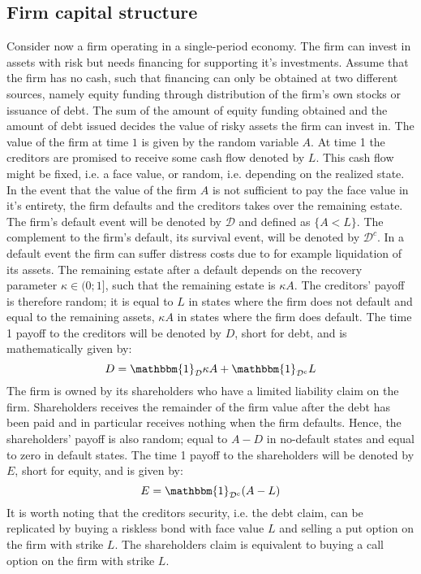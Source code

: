 \documentclass[main.tex]{subfiles}
\begin{document}
    \subsection{Firm capital structure}
        Consider now a firm operating in a single-period economy.
        The firm can invest in assets with risk but needs financing for supporting it's investments.
        Assume that the firm has no cash, such that financing can only be obtained at two different sources, namely equity funding through distribution of the firm's own stocks or issuance of debt.
        The sum of the amount of equity funding obtained and the amount of debt issued decides the value of risky assets the firm can invest in.
        The value of the firm at time $1$ is given by the random variable $A$.
        At time 1 the creditors are promised to receive some cash flow denoted by $L$.
        This cash flow might be fixed, i.e. a face value, 
        or random, i.e. depending on the realized state.
        In the event that the value of the firm $A$ is not sufficient to pay the face value in it's entirety, the firm defaults and the creditors takes over the remaining estate. 
        The firm's default event will be denoted by $\mathcal{D}$ and defined as $\{A < L\}$.
        The complement to the firm's default, its survival event, 
        will be denoted by $\mathcal{D}^{c}$.
        In a default event the firm can suffer distress costs due to for example liquidation of its assets.
        The remaining estate after a default depends on the recovery parameter $\kappa \in (0;1]$, such that the remaining estate is $\kappa A$.
        The creditors' payoff is therefore random; 
        it is equal to $L$ in states where the firm does not default
        and equal to the remaining assets, $\kappa A$ in states where the firm does default.
        The time 1 payoff to the creditors will be denoted by $D$, short for debt,
        and is mathematically given by:
            \begin{equation}
                D
                =
                \mathbbm{1}_{\mathcal{D}} \kappa A
                +
                \mathbbm{1}_{\mathcal{D}^{c}} L
            \end{equation}
        The firm is owned by its shareholders who have a limited liability claim on the firm.
        Shareholders receives the remainder of the firm value after the debt has been paid and in particular receives nothing when the firm defaults.
        Hence, the shareholders' payoff is also random;
        equal to $A - D$ in no-default states and equal to zero in default states.
        The time 1 payoff to the shareholders will be denoted by $E$, short for equity,
        and is given by:
            \begin{equation}
                E
                =
                \mathbbm{1}_{\mathcal{D}^{c}} 
                (A - L)
            \end{equation}
        It is worth noting that the creditors security, i.e. the debt claim, can be replicated by buying a riskless bond with face value $L$ and selling a put option on the firm with strike $L$.
        The shareholders claim is equivalent to buying a call option on the firm with strike $L$.
\end{document}
